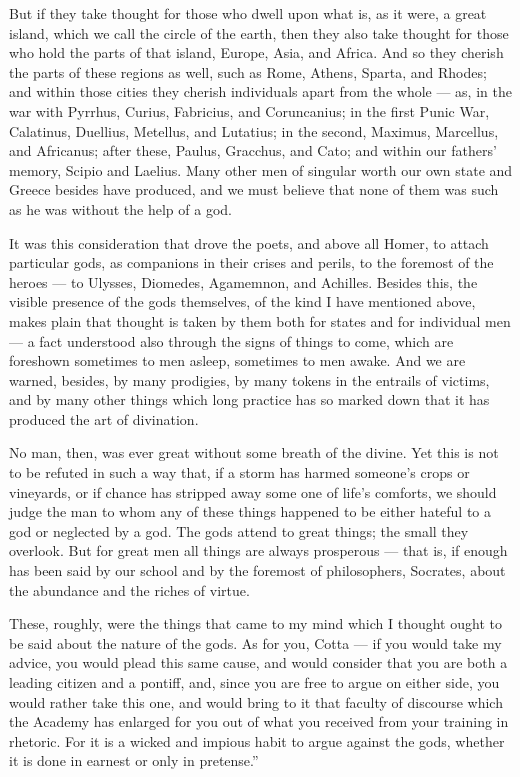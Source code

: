  But if they take thought for those who dwell upon what is, as it were, a great island, which we call the circle of the earth, then they also take thought for those who hold the parts of that island, Europe, Asia, and Africa. And so they cherish the parts of these regions as well, such as Rome, Athens, Sparta, and Rhodes; and within those cities they cherish individuals apart from the whole — as, in the war with Pyrrhus, Curius, Fabricius, and Coruncanius; in the first Punic War, Calatinus, Duellius, Metellus, and Lutatius; in the second, Maximus, Marcellus, and Africanus; after these, Paulus, Gracchus, and Cato; and within our fathers' memory, Scipio and Laelius. Many other men of singular worth our own state and Greece besides have produced, and we must believe that none of them was such as he was without the help of a god.

 It was this consideration that drove the poets, and above all Homer, to attach particular gods, as companions in their crises and perils, to the foremost of the heroes — to Ulysses, Diomedes, Agamemnon, and Achilles. Besides this, the visible presence of the gods themselves, of the kind I have mentioned above, makes plain that thought is taken by them both for states and for individual men — a fact understood also through the signs of things to come, which are foreshown sometimes to men asleep, sometimes to men awake. And we are warned, besides, by many prodigies, by many tokens in the entrails of victims, and by many other things which long practice has so marked down that it has produced the art of divination.

 No man, then, was ever great without some breath of the divine. Yet this is not to be refuted in such a way that, if a storm has harmed someone's crops or vineyards, or if chance has stripped away some one of life's comforts, we should judge the man to whom any of these things happened to be either hateful to a god or neglected by a god. The gods attend to great things; the small they overlook. But for great men all things are always prosperous — that is, if enough has been said by our school and by the foremost of philosophers, Socrates, about the abundance and the riches of virtue.

 These, roughly, were the things that came to my mind which I thought ought to be said about the nature of the gods. As for you, Cotta — if you would take my advice, you would plead this same cause, and would consider that you are both a leading citizen and a pontiff, and, since you are free to argue on either side, you would rather take this one, and would bring to it that faculty of discourse which the Academy has enlarged for you out of what you received from your training in rhetoric. For it is a wicked and impious habit to argue against the gods, whether it is done in earnest or only in pretense.''

